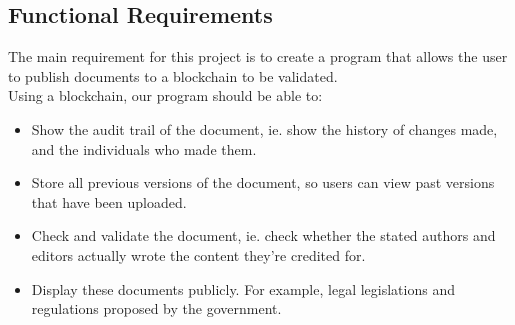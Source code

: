 \newpage
\subsection{Functional Requirements}
The main requirement for this project is to create a program that allows the user to publish documents 
to a blockchain to be validated.
\\Using a blockchain, our program should be able to:

\begin{itemize}
    \item Show the audit trail of the document, ie. show the history of changes made, and the individuals who made them.
    \item Store all previous versions of the document, so users can view past versions that have been uploaded.
    \item Check and validate the document, ie. check whether the stated authors and editors actually wrote the content they’re credited for.
    \item Display these documents publicly. For example, legal legislations and regulations proposed by the government.
\end{itemize}

